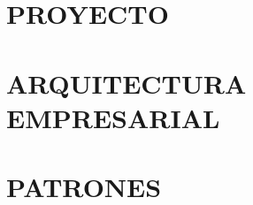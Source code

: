 \documentclass[a4paper,12pt]{report}
\begin{document}
    \maketitle
    \tableofcontents

    \part{PROYECTO}
    
    

    \part{ARQUITECTURA EMPRESARIAL}
    
    
    
    
    
    

    \part{PATRONES}
    
    
    

    \printbibliography
\end{document}
